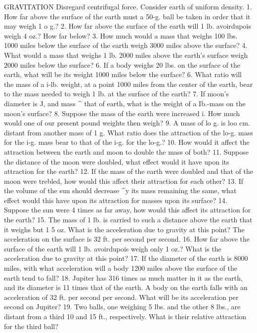 GRAVITATION
Disregard centrifugal force. Consider earth of uniform density.
1. How far above the surface of the earth must a 50-g. ball be taken in order that it may weigh 1 o g.?
2. How far above the surface of the earth will 1 lb. avoirdupois weigh 4 oz.? How far below?
3. How much would a mass that weighs 100 lbs. 1000 miles below the surface of the earth weigh 3000 miles above the surface?
4. What would a mass that weighs 1 lb. 2000 miles above the earth's surface weigh 2000 miles below the surface?
6. If a body weighs 20 lbs. on the surface of the earth, what will be its weight 1000 miles below the surface?
6. What ratio will the mass of a i-lb. weight, at a point 1000 miles from the center of the earth, bear to the mass needed to weigh 1 lb. at the surface of the earth?
7. If moon's diameter is J, and mass ^ that of earth, what is the weight of a Ib.-mass on the moon's surface?
8. Suppose the mass of the earth were increased i. How much would one of our present pound weights then weigh?
9. A mass of lo g. is loo cm. distant from another mass of 1 g. What ratio does the attraction of the lo-g. mass for the i-g. mass bear to that of the i-g. for the lo-g.?
10. How would it affect the attraction between the earth and moon to double the mass of both?
11. Suppose the distance of the moon were doubled, what effect would it have upon its attraction for the earth?
12. If the mass of the earth were doubled and that of the moon were trebled, how would this affect their attraction for each other?
13. If the volume of the sun should decrease ^y its mass remaining the same, what effect would this have upon its attraction for masses upon its surface?
14. Suppose the sun were 4 times as far away, how would this affect its attraction for the earth?
15. The mass of 1 lb. is carried to such a distance above the earth that it weighs but 1 5 oz. What is the acceleration due to gravity at this point? The acceleration on the surface is 32 ft. per second per second.
16. How far above the surface of the earth will 1 lb. avoirdupois weigh only 1 oz.? What is the acceleration due to gravity at this point?
17. If the diameter of the earth is 8000 miles, with what acceleration will a body 1200 miles above the surface of the earth tend to fall?
18. Jupiter has 316 times as much matter in it as the earth, and its diameter is 11 times that of the earth. A body on the earth falls with an acceleration of 32 ft. per second per second. What will be its acceleration per second on Jupiter?
19. Two balls, one weighing 5 lbs. and the other 8 lbs., are distant from a third 10 and 15 ft., respectively. What is their relative attraction for the third ball?
